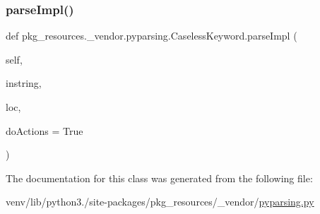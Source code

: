 \subsubsection{\texorpdfstring{parse\+Impl()}{parseImpl()}}
{\footnotesize\ttfamily def pkg\+\_\+resources.\+\_\+vendor.\+pyparsing.\+Caseless\+Keyword.\+parse\+Impl (\begin{DoxyParamCaption}\item[{}]{self,  }\item[{}]{instring,  }\item[{}]{loc,  }\item[{}]{do\+Actions = {\ttfamily True} }\end{DoxyParamCaption})}



The documentation for this class was generated from the following file\+:\begin{DoxyCompactItemize}
\item 
venv/lib/python3./site-\/packages/pkg\+\_\+resources/\+\_\+vendor/\hyperlink{pkg__resources_2__vendor_2pyparsing_8py}{pyparsing.\+py}\end{DoxyCompactItemize}
